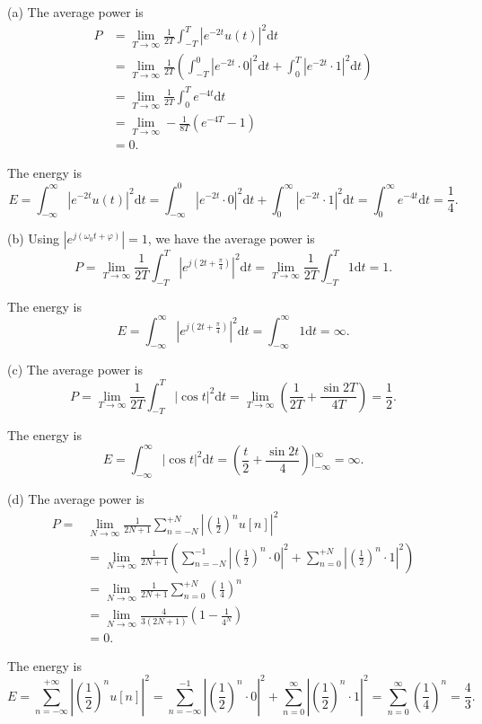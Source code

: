 \documentclass[a4paper]{article}
\begin{document}
(a) The average power is
\begin{align*}
  P&=\lim_{T\rightarrow\infty}\frac{1}{2T}\int_{-T}^T|e^{-2t}u(t)|^2\mathrm{d}t\\
  &=\lim_{T\rightarrow\infty}\frac{1}{2T}(\int_{-T}^0|e^{-2t}\cdot0|^2\mathrm{d}t+\int_0^T|e^{-2t}\cdot1|^2\mathrm{d}t)\\
  &=\lim_{T\rightarrow\infty}\frac{1}{2T}\int_0^Te^{-4t}\mathrm{d}t\\
  &=\lim_{T\rightarrow\infty}-\frac{1}{8T}(e^{-4T}-1)\\
  &=0.
\end{align*}

The energy is
$$E=\int_{-\infty}^\infty|e^{-2t}u(t)|^2\mathrm{d}t=\int_{-\infty}^{0}|e^{-2t}\cdot0|^2\mathrm{d}t+\int_{0}^{\infty}|e^{-2t}\cdot1|^2\mathrm{d}t=\int_{0}^{\infty}e^{-4t}\mathrm{d}t=\frac{1}{4}.$$

(b) Using $|e^{j(\omega_0t+\varphi)}|=1$, we have the average power is
$$P=\lim_{T\rightarrow\infty}\frac{1}{2T}\int_{-T}^T|e^{j(2t+\frac{\pi}{4})}|^2\mathrm{d}t=\lim_{T\rightarrow\infty}\frac{1}{2T}\int_{-T}^T1\mathrm{d}t=1.$$

The energy is
$$E=\int_{-\infty}^\infty|e^{j(2t+\frac{\pi}{4})}|^2\mathrm{d}t=\int_{-\infty}^{\infty}1\mathrm{d}t=\infty.$$

(c) The average power is
$$P=\lim_{T\rightarrow\infty}\frac{1}{2T}\int_{-T}^T|\cos{t}|^2\mathrm{d}t=\lim_{T\rightarrow\infty}(\frac{1}{2T}+\frac{\sin{2T}}{4T})=\frac{1}{2}.$$

The energy is
$$E=\int_{-\infty}^\infty|\cos{t}|^2\mathrm{d}t=(\frac{t}{2}+\frac{\sin{2t}}{4})\bigg|_{-\infty}^{\infty}=\infty.$$

(d) The average power is
\begin{align*}
  P=&\lim_{N\rightarrow\infty}\frac{1}{2N+1}\sum_{n=-N}^{+N}|(\frac{1}{2})^nu[n]|^2\\
  &=\lim_{N\rightarrow\infty}\frac{1}{2N+1}(\sum_{n=-N}^{-1}|(\frac{1}{2})^n\cdot0|^2+\sum_{n=0}^{+N}|(\frac{1}{2})^n\cdot1|^2)\\
  &=\lim_{N\rightarrow\infty}\frac{1}{2N+1}\sum_{n=0}^{+N}(\frac{1}{4})^n\\
  &=\lim_{N\rightarrow\infty}\frac{4}{3(2N+1)}(1-\frac{1}{4^N})\\
  &=0.
\end{align*}

The energy is
$$E=\sum_{n=-\infty}^{+\infty}|(\frac{1}{2})^nu[n]|^2=\sum_{n=-\infty}^{-1}|(\frac{1}{2})^n\cdot0|^2+\sum_{n=0}^{\infty}|(\frac{1}{2})^n\cdot1|^2=\sum_{n=0}^{\infty}(\frac{1}{4})^n=\frac{4}{3}.$$
\end{document}
